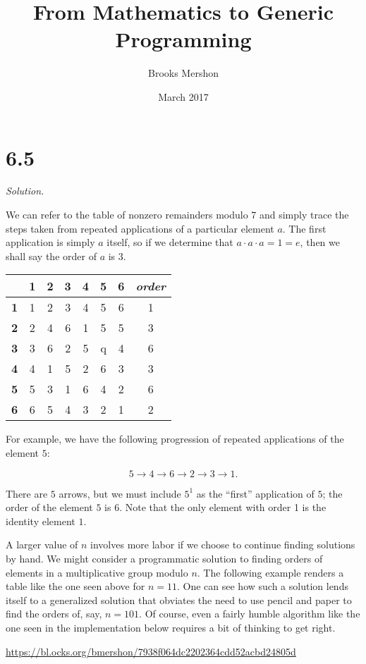 \documentclass{article}
\title{From Mathematics to Generic Programming}
\author{Brooks Mershon}
\date{March 2017}
\begin{document}
\maketitle

\section*{6.5}

\textit{Solution.}

We can refer to the table of nonzero remainders modulo 7 and simply trace the steps taken from repeated applications of a particular element $a$. The first application is simply $a$ itself, so if we determine that $a \cdot a \cdot a = 1 = e$, then we shall say the order of $a$ is $3$.

\begin{center}
\begin{tabular}{ c|c|c|c|c|c|c|c} 
 & \textbf{1} & \textbf{2} & \textbf{3} & \textbf{4} & \textbf{5} & \textbf{6} & \textit{order} \\
 \hline
 \textbf{1} & 1 & 2 & 3 & 4 & 5 & 6 & 1 \\ 
 \hline
 \textbf{2} & 2 & 4 & 6 & 1 & 5 & 5 & 3 \\ 
 \hline
 \textbf{3} & 3 & 6 & 2 & 5 & q & 4 & 6\\ 
 \hline
 \textbf{4} & 4 & 1 & 5 & 2 & 6 & 3 & 3\\ 
 \hline
 \textbf{5} & 5 & 3 & 1 & 6 & 4 & 2 & 6\\
 \hline
 \textbf{6} & 6 & 5 & 4 & 3 & 2 & 1 & 2\\
 \hline
\end{tabular}
\end{center}

For example, we have the following progression of repeated applications of the element $5$:

$$5 \rightarrow 4 \rightarrow 6 \rightarrow 2 \rightarrow 3 \rightarrow 1.$$

There are $5$ arrows, but we must include $5^1$ as the ``first'' application of $5$; the order of the element $5$ is $6$. Note that the only element with order 1 is the identity element $1$.

A larger value of $n$ involves more labor if we choose to continue finding solutions by hand. We might consider a programmatic solution to finding orders of elements in a multiplicative group modulo $n$. The following example renders a table like the one seen above for $n = 11$. One can see how such a solution lends itself to a generalized solution that obviates the need to use pencil and paper to find the orders of, say, $n = 101$. Of course, even a fairly humble algorithm like the one seen in the implementation below requires a bit of thinking to get right.

\bigskip

\url{https://bl.ocks.org/bmershon/7938f064dc2202364cdd52acbd24805d}
\end{document}
